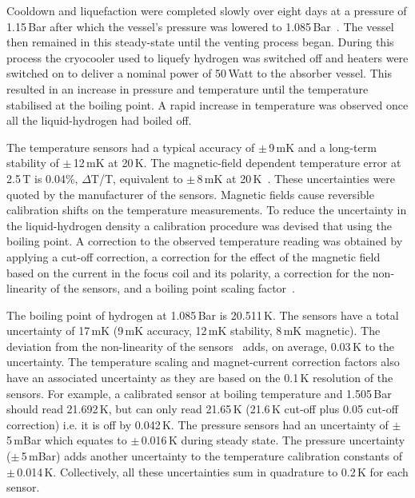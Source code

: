 Cooldown and liquefaction were completed slowly over eight days at a
pressure of 1.15\,Bar after which the vessel's pressure was lowered to
1.085\,Bar~\cite{1748-0221-13-09-T09008}.
The vessel then remained in this steady-state until the
venting process began.
During this process the cryocooler used to liquefy hydrogen was
switched off and heaters were switched on to deliver a nominal power
of 50\,Watt to the absorber vessel.
This resulted in an increase in pressure and temperature until the
temperature stabilised at the boiling point.
A rapid increase in temperature was observed once all the
liquid-hydrogen had boiled off. 

The temperature sensors had a typical accuracy of
$\mathrm{\pm}$\,9\,mK and a long-term stability of
$\mathrm{\pm}$\,12\,mK at 20\,K.
The magnetic-field dependent temperature error at 2.5\,T is 0.04\%,
$\Delta$T/T, equivalent to $\mathrm{\pm}$\,8\,mK at
20\,K~\cite{CernoxRTDs}\cite{TemperatureMeasurement}.
These uncertainties were quoted by the manufacturer of the sensors.
Magnetic fields cause reversible calibration shifts on the temperature
measurements.
To reduce the uncertainty in the liquid-hydrogen density a calibration
procedure was devised that using the boiling point.
A correction to the observed temperature reading was obtained by
applying a cut-off correction, a correction for the effect of the
magnetic field based on the current in the focus coil and its
polarity, a correction for the non-linearity of the sensors, and a 
boiling point scaling factor~\cite{NOTE524}.  
 
The boiling point of hydrogen at 1.085\,Bar is 20.511\,K.
The sensors have a total uncertainty of 17\,mK (9\,mK accuracy, 12\,mK
stability, 8\,mK magnetic).
The deviation from the non-linearity of the sensors~\cite{CernoxRTDs}\cite{TemperatureMeasurement} adds, on average,
0.03\,K to the uncertainty.
The temperature scaling and magnet-current correction factors also
have an associated uncertainty as they are based on the 0.1\,K
resolution of the sensors.  
For example, a calibrated sensor at boiling temperature and 1.505\,Bar
should read 21.692\,K, but can only read 21.65\,K (21.6\,K cut-off
plus 0.05 cut-off correction) i.e. it is off by 0.042\,K.
The pressure sensors had an uncertainty of $\mathrm{\pm}$\,5\,mBar
which equates to $\mathrm{\pm}$\,0.016\,K during steady state.
The pressure uncertainty ($\mathrm{\pm}$\,5\,mBar) adds another
uncertainty to the temperature calibration constants of
$\mathrm{\pm}$\,0.014\,K.
Collectively, all these uncertainties sum in quadrature to 0.2\,K for
each sensor.
 
